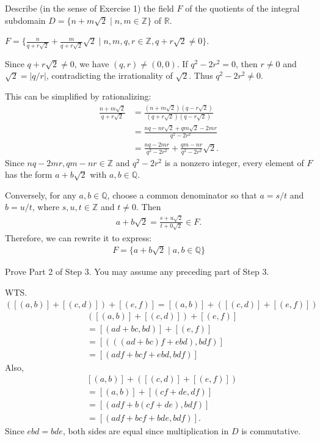 \documentclass[11pt]{article}
\begin{document}
\begin{problem}[21.2]
Describe (in the sense of Exercise 1) the field $F$ of the quotients of the integral subdomain $D = \{n + m\sqrt{2} \mid n, m \in \mathbb{Z}\}$ of $\mathbb{R}$.

\begin{solution}
$F = \{\frac{n}{q+r\sqrt{2}} + \frac{m}{q+r\sqrt{2}}\sqrt{2}\mid n,m,q,r \in \mathbb{Z}, q+r\sqrt{2}\neq0\}$.

Since $q+r\sqrt{2}\neq0$, we have $(q,r)\neq(0,0)$. If $q^2-2r^2=0$, then $r\neq0$ and $\sqrt{2}=|q/r|$, contradicting the irrationality of $\sqrt{2}$. Thus $q^2-2r^2\neq0$.

This can be simplified by rationalizing:
\begin{align*}
\frac{n+m\sqrt{2}}{q+r\sqrt{2}}
&=\frac{(n+m\sqrt{2})(q-r\sqrt{2})}{(q+r\sqrt{2})(q-r\sqrt{2})}\\
&= \frac{nq-nr\sqrt{2}+qm\sqrt{2}-2mr}{q^2-2r^2}\\
&= \frac{nq-2mr}{q^2-2r^2} + \frac{qm-nr}{q^2-2r^2}\sqrt{2}.
\end{align*}
Since $nq - 2mr, qm-nr \in \mathbb{Z}$ and $q^2-2r^2$ is a nonzero integer, every element of $F$ has the form $a+b\sqrt{2}$ with $a,b\in\mathbb{Q}$.

Conversely, for any $a,b\in\mathbb{Q}$, choose a common denominator so that $a=s/t$ and $b=u/t$, where $s,u,t\in\mathbb{Z}$ and $t\neq0$. Then
\begin{align*}
a+b\sqrt{2}=\frac{s+u\sqrt{2}}{t+0\sqrt{2}}\in F.
\end{align*}
Therefore, we can rewrite it to express:
\begin{align*}
\boxed{F=\{a+b\sqrt{2}\mid a,b \in \mathbb{Q}\}}
\end{align*}
\end{solution}
\end{problem}

\begin{problem}[21.6]
Prove Part 2 of Step 3. You may assume any preceding part of Step 3.

\begin{solution}
WTS. $([(a,b)] + [(c,d)]) + [(e,f)] = [(a,b)] + ([(c,d)] + [(e,f)])$
\begin{align*}
    & ([(a,b)] + [(c,d)]) + [(e,f)]\\
    &= [(ad+bc, bd)] + [(e,f)]\\
    &= [(((ad + bc)f + ebd), bdf)]\\
    &= [(adf + bcf + ebd, bdf)]
\end{align*}
Also,
\begin{align*}
    & [(a,b)] + ([(c,d)] + [(e,f)])\\
    &= [(a,b)] + [(cf+de, df)]\\
    &= [(adf+b(cf+de), bdf)]\\
    &= [(adf+bcf+bde, bdf)].
\end{align*}
Since $ebd=bde$, both sides are equal since multiplication in $D$ is commutative.
\end{solution}
\end{problem}
\end{document}
